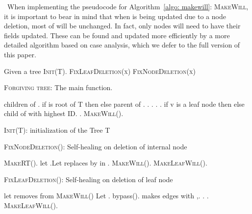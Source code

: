 \documentclass[11pt]{article}
\begin{document}
\par{}\ 
When implementing the pseudocode for Algorithm~\ref{algo: makewill}:
\textsc{MakeWill}, 
it is important to bear in mind that when  is being
updated due to a node deletion, most of  will be
unchanged.  In fact, only  nodes will need to have their
fields updated.  These can be found and updated more efficiently
by a more detailed algorithm based on case analysis, which we 
defer to the full version of this paper.



\begin{algorithm}[ph!]
\begin{algorithmic}[1]
\STATE Given a tree 
\STATE \textsc{Init(T)}.
\STATE \textsc{FixLeafDeletion(x)}
\ELSE 
\STATE \textsc{FixNodeDeletion(x)}
\ENDIF
\ENDIF
\ENDWHILE
\end{algorithmic}
\caption{\textsc{Forgiving tree}: The main function.}
\label{algo: forgiving}
\end{algorithm}
 
 \begin{algorithm}[ph!]
\begin{algorithmic}[1]
\STATE  children of .
\STATE  if  is root of T then  else parent of .
\STATE . 
\STATE .
\STATE . 
\STATE . 
\STATE  if v is a leaf node then  else child of  with highest ID.
\STATE .
\STATE \textsc{MakeWill}().
\ENDFOR
\end{algorithmic}
\caption{\textsc{Init(T)}: initialization of the Tree T} 
\label{algo: init}
\end{algorithm}

 
\begin{algorithm}[ph!]
\caption{\textsc{FixNodeDeletion()}: Self-healing on deletion of internal node }
\label{algo: fixnode}
\begin{algorithmic}[1]
\STATE \textsc{MakeRT}().
\STATE \label{algline: ND2} let .Let 
\IF {} 
\STATE   replaces  by  in .
\STATE \textsc{MakeWill}().
\ENDIF \label{algline: ND6}
\STATE \textsc{MakeLeafWill}().
\ENDIF
\ENDFOR
\end{algorithmic}
\end{algorithm}
  


 \begin{algorithm}[ph!]
\caption{\textsc{FixLeafDeletion()}: Self-healing on deletion of leaf node}
\label{algo: fixleaf}
\begin{algorithmic}[1]
\STATE let 
\IF {}
\STATE  removes  from 
\STATE 
\STATE \textsc{MakeWill}()
\ELSE
\STATE Let .
\IF {}
\STATE bypass().
\ENDIF
\STATE  makes edges with ,.
\STATE .
\STATE .
\STATE  
\ENDIF
\ENDIF
{}
\STATE \textsc{MakeLeafWill}().
\ENDIF
\ENDFOR
\end{algorithmic}
\end{algorithm}
\end{document}
